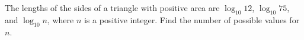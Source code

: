 The lengths of the sides of a triangle with positive area are $\log_{10} 12$, $\log_{10} 75$, and $\log_{10} n$, where $n$ is a positive integer. Find the number of possible values for $n$.